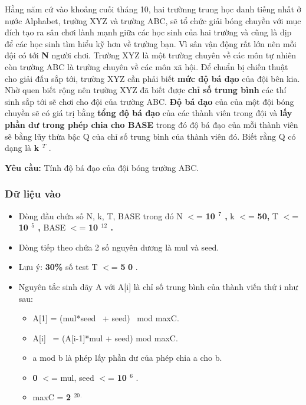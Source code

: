 





    Hằng năm cứ vào khoảng cuối tháng 10, hai trườnng trung học danh tiếng nhất ở nước Alphabet, trường XYZ và trường ABC, sẽ tổ chức giải bóng chuyền với mục đích tạo ra sân chơi lành mạnh giữa các học sinh của hai trường và cũng là dịp để các học sinh tìm hiểu kỹ hơn về trường bạn. Vì sân vận động rất lớn nên mỗi đội có tới    \textbf{     N    }    người chơi. Trường XYZ là một trường chuyên về các môn tự nhiên còn trường ABC là trường chuyên về các môn xã hội. Để chuẩn bị chiến thuật cho giải đấu sắp tới, trường XYZ cần phải biết    \textbf{     mức độ bá đạo    }    của đội bên kia. Nhờ quen biết rộng nên trường XYZ đã biết được    \textbf{     chỉ số trung bình    }    các thí sinh sắp tới sẽ chơi cho đội của trường ABC.    \textbf{     Độ bá đạo    }    của của một đội bóng chuyền sẽ có giá trị bằng    \textbf{     tổng độ bá đạo    }    của các thành viên trong đội và    \textbf{     lấy phần dư trong phép chia cho BASE    }    trong đó độ bá đạo của mỗi thành viên sẽ bằng lũy thừa bậc Q của chỉ số trung bình của thành viên đó. Biết rằng Q có dạng là    \textbf{     k     $^      T     $}    .   



\textbf{     Yêu cầu:    }    Tính độ bá đạo của đội bóng trường ABC.   



\subsubsection{    Dữ liệu vào   }


\begin{itemize}
	\item      Dòng đầu chứa số N, k, T, BASE trong đó N $<$=     \textbf{      10      $^       7      $      ,     }     k $<$=     \textbf{      50,     }     T $<$=     \textbf{      10      $^       5      $      ,     }     BASE $<$=     \textbf{      10      $^       12      $      .     }
	\item      Dòng tiếp theo chứa 2 số nguyên dương là mul và seed.    
	\item      Lưu ý:     \textbf{      30\%     }     số test T $<$=     \textbf{      5     }\textbf{      0     }     .    
	\item      Nguyên tắc sinh dãy A với A[i] là chỉ số trung bình của thành viến thứ i như sau:    
\begin{itemize}
	\item        A[1] = (mul*seed  + seed)  mod maxC.      
	\item        A[i]  = (A[i-1]*mul + seed) mod maxC.      
	\item        a mod b là phép lấy phần dư của phép chia a cho b.      
	\item \textbf{        0       }       $<$= mul, seed $<$=       \textbf{        10        $^         6        $}       .      
	\item        maxC =       \textbf{\textbf{         2        }$^         20        $$^         .        $}
\end{itemize}
\end{itemize}



